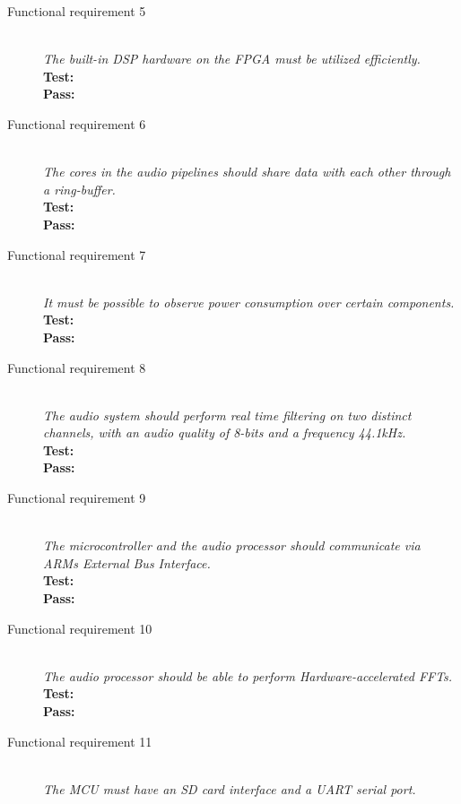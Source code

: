\begin{description}
    \item[Functional requirement 5] \hfill \\
        \textit{The built-in DSP hardware on the FPGA must be utilized efficiently.} \\
        \textbf{Test:} \\
        \textbf{Pass:} \\
    \item[Functional requirement 6] \hfill \\
        \textit{The cores in the audio pipelines should share data with each other through a ring-buffer.} \\
        \textbf{Test:} \\
        \textbf{Pass:} \\
    \item[Functional requirement 7] \hfill \\
        \textit{It must be possible to observe power consumption over certain components.} \\
        \textbf{Test:} \\
        \textbf{Pass:} \\
    \item[Functional requirement 8] \hfill \\
        \textit{The audio system should perform real time filtering on
        two distinct channels, with an audio quality of 8-bits and a frequency 44.1kHz.} \\
        \textbf{Test:} \\
        \textbf{Pass:} \\
    \item[Functional requirement 9] \hfill \\
        \textit{The microcontroller and the audio processor should communicate via ARMs
        External Bus Interface.} \\
        \textbf{Test:} \\
        \textbf{Pass:} \\
    \item[Functional requirement 10] \hfill \\
        \textit{The audio processor should be able to perform Hardware-accelerated FFTs.} \\
        \textbf{Test:} \\
        \textbf{Pass:} \\
    \item[Functional requirement 11] \hfill \\
        \textit{The MCU must have an SD card interface and a UART serial port.} \\

\end{description}
